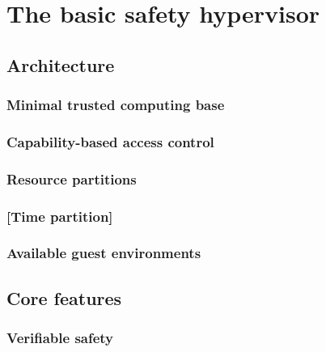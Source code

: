 
\chapter{The basic safety hypervisor} %

\label{Chapter2} %


\newcommand{\keyword}[1]{\textbf{#1}}
\newcommand{\tabhead}[1]{\textbf{#1}}
\newcommand{\code}[1]{\texttt{#1}}
\newcommand{\file}[1]{\texttt{\bfseries#1}}
\newcommand{\option}[1]{\texttt{\itshape#1}}


\section{Architecture}
\subsection{Minimal trusted computing base}
\subsection{Capability-based access control}
\subsection{Resource partitions}
\subsection{[Time partition]}
\subsection{Available guest environments}


\section{Core features}
\subsection{Verifiable safety}
